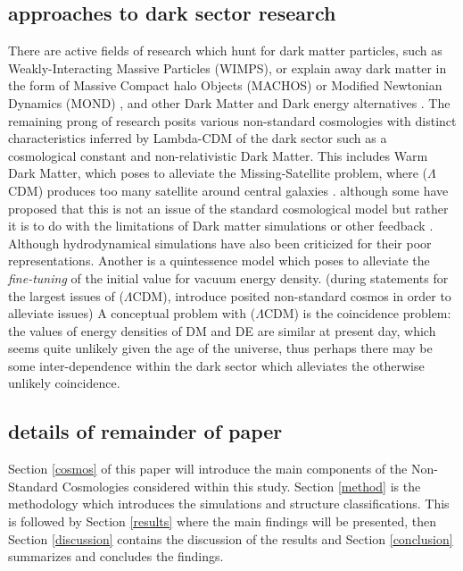 \documentclass[a4paper,fleqn,usenatbib]{mnras}
\begin{document}
\subsection{approaches to dark sector research}
There are active fields of research which hunt for dark matter particles, such as Weakly-Interacting Massive Particles (WIMPS), or explain away dark matter in the form of Massive Compact halo Objects (MACHOS) \citep{Alcock_00} or Modified Newtonian Dynamics (MOND) \citep{Milgrom_15}, and other Dark Matter and Dark energy alternatives \citep[e.g][]{Mannheim_06}. The remaining prong of research posits various non-standard cosmologies with distinct characteristics inferred by Lambda-CDM of the dark sector such as a cosmological constant and non-relativistic Dark Matter. 
This includes Warm Dark Matter, which poses to alleviate the Missing-Satellite problem, where ($\Lambda$CDM) produces too many satellite around central galaxies \citep{Klypin_99,Moore_99}. although some have proposed that this is not an issue of the standard cosmological model but rather it is to do with the limitations of Dark matter simulations \citep{Wetzel_16} or other feedback \citep[e.g][]{Bullock_00}. Although hydrodynamical simulations have also been criticized for their poor representations.
Another is a quintessence model which poses to alleviate the \textit{fine-tuning} of the initial value for vacuum energy density.
(during statements for the largest issues of ($\Lambda$CDM), introduce posited non-standard cosmos in order to alleviate issues)
A conceptual problem with ($\Lambda$CDM) is the coincidence problem:  the values of energy densities of DM and DE are similar at present day, which seems quite unlikely given the age of the universe, thus perhaps there may be some inter-dependence within the dark sector which alleviates the otherwise unlikely coincidence. 

\subsection{details of remainder of paper}
Section \ref{cosmos} of this paper will introduce the main components of the Non-Standard Cosmologies considered within this study. Section \ref{method} is the methodology which introduces the simulations and structure classifications. This is followed by Section \ref{results} where the main findings will be presented, then Section \ref{discussion} contains the discussion of the results and Section \ref{conclusion} summarizes and concludes the findings. 
\end{document}
